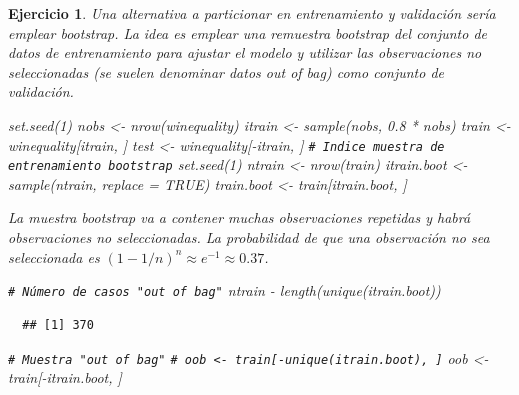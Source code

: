 \documentclass[
]{book}
\newenvironment{Shaded}{\begin{snugshade}}{\end{snugshade}}
\newcommand{\AttributeTok}[1]{\textcolor[rgb]{0.77,0.63,0.00}{#1}}
\newcommand{\CommentTok}[1]{\textcolor[rgb]{0.56,0.35,0.01}{\textit{#1}}}
\newcommand{\ConstantTok}[1]{\textcolor[rgb]{0.00,0.00,0.00}{#1}}
\newcommand{\DecValTok}[1]{\textcolor[rgb]{0.00,0.00,0.81}{#1}}
\newcommand{\FloatTok}[1]{\textcolor[rgb]{0.00,0.00,0.81}{#1}}
\newcommand{\FunctionTok}[1]{\textcolor[rgb]{0.00,0.00,0.00}{#1}}
\newcommand{\NormalTok}[1]{#1}
\newcommand{\OtherTok}[1]{\textcolor[rgb]{0.56,0.35,0.01}{#1}}
\newcommand{\SpecialCharTok}[1]{\textcolor[rgb]{0.00,0.00,0.00}{#1}}
\theoremstyle{break}
\newtheorem{exercise}{Ejercicio}[chapter]
\theoremstyle{nonumberplain}
\renewcommand{\CommentTok}[1]{\textcolor[rgb]{0.41,0.41,0.41}{\texttt{#1}}}
\begin{document}
\begin{exercise}
\protect\hypertarget{exr:train-boot-tree}{}\label{exr:train-boot-tree}Una alternativa a particionar en entrenamiento y validación sería emplear bootstrap.
La idea es emplear una remuestra bootstrap del conjunto de datos de entrenamiento para ajustar el modelo y utilizar las observaciones no seleccionadas (se suelen denominar datos \emph{out of bag}) como conjunto de validación.

\begin{Shaded}
\begin{Highlighting}[]
\FunctionTok{set.seed}\NormalTok{(}\DecValTok{1}\NormalTok{)}
\NormalTok{nobs }\OtherTok{\textless{}{-}} \FunctionTok{nrow}\NormalTok{(winequality)}
\NormalTok{itrain }\OtherTok{\textless{}{-}} \FunctionTok{sample}\NormalTok{(nobs, }\FloatTok{0.8} \SpecialCharTok{*}\NormalTok{ nobs)}
\NormalTok{train }\OtherTok{\textless{}{-}}\NormalTok{ winequality[itrain, ]}
\NormalTok{test }\OtherTok{\textless{}{-}}\NormalTok{ winequality[}\SpecialCharTok{{-}}\NormalTok{itrain, ]}
\CommentTok{\# Indice muestra de entrenamiento bootstrap}
\FunctionTok{set.seed}\NormalTok{(}\DecValTok{1}\NormalTok{)}
\NormalTok{ntrain }\OtherTok{\textless{}{-}} \FunctionTok{nrow}\NormalTok{(train)}
\NormalTok{itrain.boot }\OtherTok{\textless{}{-}} \FunctionTok{sample}\NormalTok{(ntrain, }\AttributeTok{replace =} \ConstantTok{TRUE}\NormalTok{)}
\NormalTok{train.boot }\OtherTok{\textless{}{-}}\NormalTok{ train[itrain.boot, ]}
\end{Highlighting}
\end{Shaded}

La muestra bootstrap va a contener muchas observaciones repetidas y habrá observaciones no seleccionadas.
La probabilidad de que una observación no sea seleccionada es \((1 - 1/n)^n \approx e^{-1} \approx 0.37\).

\begin{Shaded}
\begin{Highlighting}[]
\CommentTok{\# Número de casos "out of bag"}
\NormalTok{ntrain }\SpecialCharTok{{-}} \FunctionTok{length}\NormalTok{(}\FunctionTok{unique}\NormalTok{(itrain.boot))}
\end{Highlighting}
\end{Shaded}

\begin{verbatim}
  ## [1] 370
\end{verbatim}

\begin{Shaded}
\begin{Highlighting}[]
\CommentTok{\# Muestra "out of bag"}
\CommentTok{\# oob \textless{}{-} train[{-}unique(itrain.boot), ]}
\NormalTok{oob }\OtherTok{\textless{}{-}}\NormalTok{ train[}\SpecialCharTok{{-}}\NormalTok{itrain.boot, ]}
\end{Highlighting}
\end{Shaded}


\end{exercise}
\end{document}
